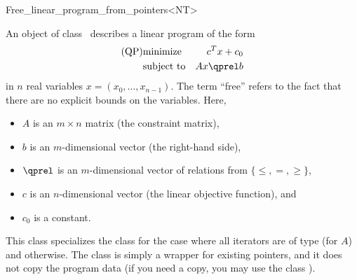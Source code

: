 \begin{ccRefClass}{Free_linear_program_from_pointers<NT>}


\ccDefinition
An object of class \ccRefName\ describes a linear program of the form
\begin{eqnarray*}
\mbox{(QP)}& \mbox{minimize} & c^{T}x+c_0 \\
&\mbox{subject to}   & Ax\qprel b
\end{eqnarray*}
in $n$ real variables $x=(x_0,\ldots,x_{n-1})$. The term ``free'' refers
to the fact that there are no explicit bounds on the variables.
Here, 
\begin{itemize}
\item $A$ is an $m\times n$ matrix (the constraint matrix), 
\item $b$ is an $m$-dimensional vector (the right-hand side),
\item $\qprel$ is an $m$-dimensional vector of relations 
from $\{\leq, =, \geq\}$, 
\item $c$ is an $n$-dimensional vector (the linear objective
  function), and 
\item $c_0$ is a constant.
\end{itemize}

This class specializes the class
 for the case where all iterators are of type 
 (for
$A$) and  otherwise. The class is simply a wrapper for 
existing pointers, and it does not copy the program data (if you need
a copy, you may use the class ).

\ccIsModel
{}

\ccSeeAlso
{}\\

\end{ccRefClass}
